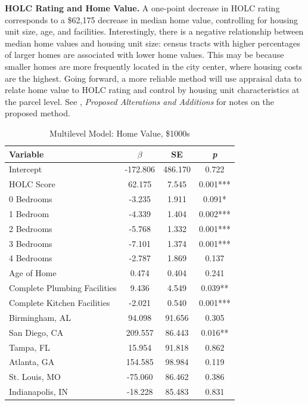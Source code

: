 \documentclass[paper=letter, fontsize=12pt]{scrartcl} %
\begin{document}
\begin{table}
	\textbf{HOLC Rating and Home Value.} A one-point decrease in HOLC rating corresponds to a \$62,175 decrease in median home value, controlling for housing unit size, age, and facilities. Interestingly, there is a negative relationship between median home values and housing unit size: census tracts with higher percentages of larger homes are associated with lower home values. This may be because smaller homes are more frequently located in the city center, where housing costs are the highest. Going forward, a more reliable method will use appraisal data to relate home value to HOLC rating and control by housing unit characteristics at the parcel level. See , \textit{Proposed Alterations and Additions} for notes on the proposed method.
	\caption{Multilevel Model: Home Value, \$1000s}
	\begin{center}
		\begin{tabular}{|| l | c c c ||}
			\hline
			Variable & $\beta$ & SE & \textit{p} \\
			\hline \hline
			Intercept & -172.806 & 486.170 & 0.722 \\
			\hline
			HOLC Score & 62.175 & 7.545 & 0.001*** \\
			\hline
			0 Bedrooms & -3.235 & 1.911 & 0.091* \\
			\hline
			1 Bedroom & -4.339 & 1.404 & 0.002*** \\
			\hline
			2 Bedrooms & -5.768 & 1.332 & 0.001*** \\
			\hline
			3 Bedrooms & -7.101 & 1.374 & 0.001*** \\
			\hline
			4 Bedrooms & -2.787 & 1.869 & 0.137 \\
			\hline
			Age of Home & 0.474 & 0.404 & 0.241 \\
			\hline
			Complete Plumbing Facilities & 9.436 & 4.549 & 0.039** \\
			\hline
			Complete Kitchen Facilities & -2.021 & 0.540 & 0.001*** \\
			\hline
			Birmingham, AL & 94.098 & 91.656 & 0.305 \\
			\hline
			San Diego, CA & 209.557 & 86.443 & 0.016** \\
			\hline
			Tampa, FL & 15.954 & 91.818 & 0.862 \\
			\hline
			Atlanta, GA & 154.585 & 98.984 & 0.119 \\
			\hline
			St. Louis, MO & -75.060 & 86.462 & 0.386 \\
			\hline
			Indianapolis, IN & -18.228 & 85.483 & 0.831 \\

\end{tabular}
\end{center}
\end{table}
\end{document}
